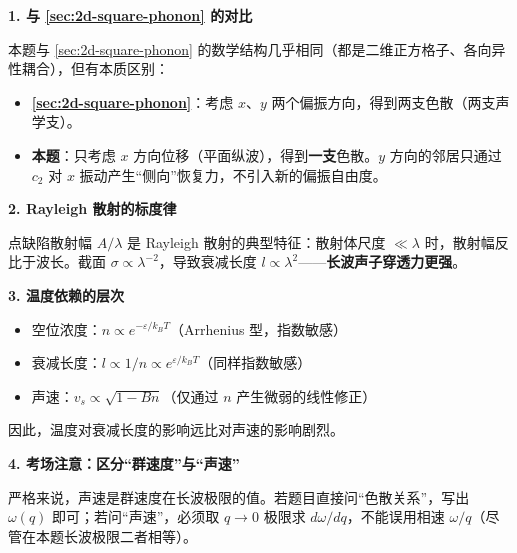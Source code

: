 \begin{insightbox}[物理图像与概念串联]
\textbf{1. 与 \ref{sec:2d-square-phonon} 的对比}

本题与 \ref{sec:2d-square-phonon} 的数学结构几乎相同（都是二维正方格子、各向异性耦合），但有本质区别：
\begin{itemize}
    \item \textbf{\ref{sec:2d-square-phonon}}：考虑 $x$、$y$ 两个偏振方向，得到两支色散（两支声学支）。
    \item \textbf{本题}：只考虑 $x$ 方向位移（平面纵波），得到\textbf{一支}色散。$y$ 方向的邻居只通过 $c_2$ 对 $x$ 振动产生``侧向''恢复力，不引入新的偏振自由度。
\end{itemize}

\textbf{2. Rayleigh 散射的标度律}

点缺陷散射幅 $A/\lambda$ 是 Rayleigh 散射的典型特征：散射体尺度 $\ll\lambda$ 时，散射幅反比于波长。截面 $\sigma\propto\lambda^{-2}$，导致衰减长度 $l\propto\lambda^2$——\textbf{长波声子穿透力更强}。

\textbf{3. 温度依赖的层次}
\begin{itemize}
    \item 空位浓度：$n\propto e^{-\varepsilon/k_BT}$（Arrhenius 型，指数敏感）
    \item 衰减长度：$l\propto 1/n\propto e^{\varepsilon/k_BT}$（同样指数敏感）
    \item 声速：$v_s\propto\sqrt{1-Bn}$（仅通过 $n$ 产生微弱的线性修正）
\end{itemize}
因此，温度对衰减长度的影响远比对声速的影响剧烈。

\textbf{4. 考场注意：区分``群速度''与``声速''}

严格来说，声速是群速度在长波极限的值。若题目直接问``色散关系''，写出 $\omega(q)$ 即可；若问``声速''，必须取 $q\to0$ 极限求 $d\omega/dq$，不能误用相速 $\omega/q$（尽管在本题长波极限二者相等）。
\end{insightbox}

